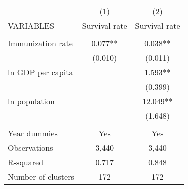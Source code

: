 \begin{tabular}{lcc} \hline
 & (1) & (2) \\
VARIABLES & Survival rate & Survival rate \\ \hline
 &  &  \\
Immunization rate & 0.077** & 0.038** \\
 & (0.010) & (0.011) \\
ln GDP per capita &  & 1.593** \\
 &  & (0.399) \\
ln population &  & 12.049** \\
 &  & (1.648) \\
 &  &  \\
Year dummies & Yes & Yes \\
Observations & 3,440 & 3,440 \\
R-squared & 0.717 & 0.848 \\
 Number of clusters & 172 & 172 \\ \hline
\end{tabular}
